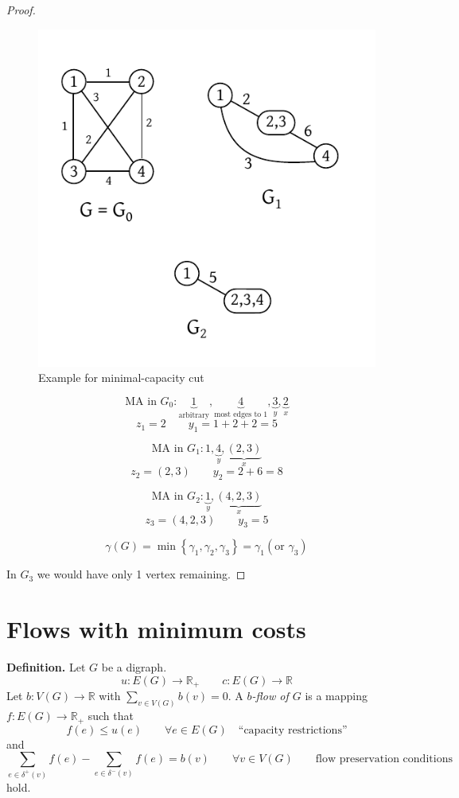 \documentclass{article}
\newcommand{\set}[1]{\left\{#1\right\}}
\begin{document}
\begin{proof}
  \begin{figure}[ht]
    \begin{center}
      \includegraphics{img/min_capacity_cut.pdf}
      \caption{Example for minimal-capacity cut}
    \end{center}
  \end{figure}

  \[
    \text{MA in $G_0$}:
      \underbrace{1}_{\text{arbitrary}},
      \underbrace{4}_{\text{most edges to 1}},
      \underbrace{3}_{y},
      \underbrace{2}_{x}
  \] \[
    z_1 = 2 \qquad y_1 = 1 + 2 + 2 = 5
  \]

  \[
    \text{MA in $G_1$}:
      1,
      \underbrace{4}_{y},
      \underbrace{(2,3)}_{x}
  \] \[
    z_2 = (2, 3) \qquad y_2 = 2 + 6 = 8
  \]

  \[
    \text{MA in $G_2$}:
      \underbrace{1}_y,
      \underbrace{(4,2,3)}_{x}
  \] \[
    z_3 = (4, 2, 3) \qquad y_3 = 5
  \]

  \[
    \gamma(G) = \min\set{\gamma_1, \gamma_2, \gamma_3} = \gamma_1 (\text{or } \gamma_3)
  \]

  In $G_3$ we would have only 1 vertex remaining.
\end{proof}

\section{Flows with minimum costs}
%
\textbf{Definition.}
  Let $G$ be a digraph.
  \[ u: E(G) \rightarrow \mathbb{R}_+ \qquad c: E(G) \rightarrow \mathbb{R} \]
  Let $b: V(G) \rightarrow \mathbb{R}$ with $\sum_{v \in V(G)} b(v) = 0$.
  A \emph{$b$-flow of $G$} is a mapping $f: E(G) \rightarrow \mathbb{R}_+$ such that
  \[ f(e) \leq u(e) \qquad \forall e \in E(G) \quad \text{``capacity restrictions''} \]
  and
  \[
    \sum_{e \in \delta^+(v)} f(e) - \sum_{e \in \delta^-(v)} f(e)
      = b(v) \qquad \forall v \in V(G)
      \qquad \text{flow preservation conditions}
  \]
  hold.
\end{document}
